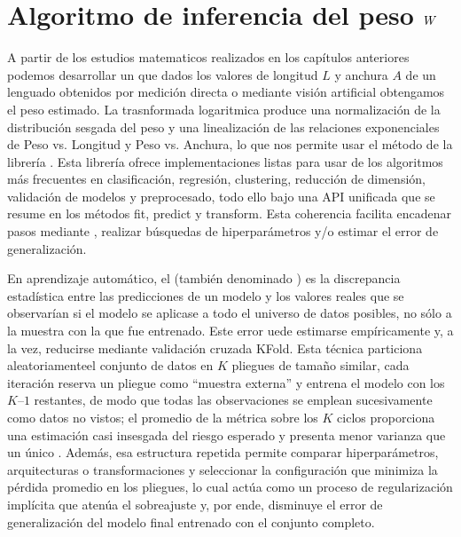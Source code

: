 \documentclass[a4paper,10pt,spanish]{jupyterBook}
\begin{document}
\section{Algoritmo de inferencia del peso \protect\(W\protect\)}
\label{\detokenize{content/03/Modelo:algoritmo-de-inferencia-del-peso-w}}\label{\detokenize{content/03/Modelo::doc}}
\sphinxAtStartPar
A partir de los estudios matematicos realizados en los capítulos anteriores podemos desarrollar un  que dados los valores de longitud \(L\) y anchura \(A\) de un lenguado obtenidos por medición directa o mediante visión artificial obtengamos el peso estimado. La trasnformada logaritmica produce una normalización de la distribución sesgada del peso y una linealización de las relaciones exponenciales de Peso vs. Longitud y Peso vs. Anchura, lo que nos permite usar el método  de la librería . Esta librería ofrece implementaciones listas para usar de los algoritmos más frecuentes en clasificación, regresión, clustering, reducción de dimensión, validación de modelos y preprocesado, todo ello bajo una API unificada que se resume en los métodos fit, predict y transform. Esta coherencia facilita encadenar pasos mediante , realizar búsquedas de hiperparámetros y/o estimar el error de generalización.

\sphinxAtStartPar
En aprendizaje automático, el  (también denominado ) es la discrepancia estadística entre las predicciones de un modelo y los valores reales que se observarían si el modelo se aplicase a todo el universo de datos posibles, no sólo a la muestra con la que fue entrenado. Este error uede estimarse empíricamente y, a la vez, reducirse mediante validación cruzada K\sphinxhyphen{}Fold. Esta técnica particiona aleatoriamenteel conjunto de datos en \(K\) pliegues de tamaño similar, cada iteración reserva un pliegue como “muestra externa” y entrena el modelo con los \(K – 1\) restantes, de modo que todas las observaciones se emplean sucesivamente como datos no vistos; el promedio de la métrica sobre los \(K\) ciclos proporciona una estimación casi insesgada del riesgo esperado y presenta menor varianza que un único . Además, esa estructura repetida permite comparar hiperparámetros, arquitecturas o transformaciones y seleccionar la configuración que minimiza la pérdida promedio en los pliegues, lo cual actúa como un proceso de regularización implícita que atenúa el sobreajuste y, por ende, disminuye el error de generalización del modelo final entrenado con el conjunto completo.
\end{document}
